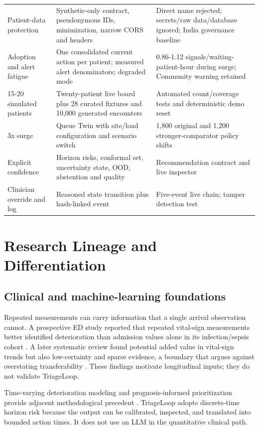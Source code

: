 \documentclass[11pt,a4paper]{article}
\begin{document}
\begin{longtable}{@{}L{37mm}L{54mm}L{65mm}@{}}
Patient-data protection & Synthetic-only contract, pseudonymous IDs, minimization, narrow CORS and headers & Direct name rejected; secrets/raw data/database ignored; India governance baseline \\
Adoption and alert fatigue & One consolidated current action per patient; measured alert denominators; degraded mode & 0.86-1.12 signals/waiting-patient-hour during surge; Community warning retained \\
15-20 simulated patients & Twenty-patient live board plus 28 curated fixtures and 10,000 generated encounters & Automated count/coverage tests and deterministic demo reset \\
3x surge & Queue Twin with site/load configuration and scenario switch & 1,800 original and 1,200 stronger-comparator policy shifts \\
Explicit confidence & Horizon risks, conformal set, uncertainty state, OOD, abstention and quality & Recommendation contract and live inspector \\
Clinician override and log & Reasoned state transition plus hash-linked event & Five-event live chain; tamper detection test \\
\bottomrule
\end{longtable}

\section{Research Lineage and Differentiation}

\subsection{Clinical and machine-learning foundations}

Repeated measurements can carry information that a single arrival observation cannot. A prospective ED study reported that repeated vital-sign measurements better identified deterioration than admission values alone in its infection/sepsis cohort \cite{quinten2018}. A later systematic review found potential added value in vital-sign trends but also low-certainty and sparse evidence, a boundary that argues against overstating transferability \cite{brekke2019}. These findings motivate longitudinal inputs; they do not validate TriageLoop.

Time-varying deterioration modeling and prognosis-informed prioritization provide adjacent methodological precedent \cite{timevarying2026,traumaranking2023}. TriageLoop adopts discrete-time horizon risk because the output can be calibrated, inspected, and translated into bounded action times. It does not use an LLM in the quantitative clinical path.
\end{document}
